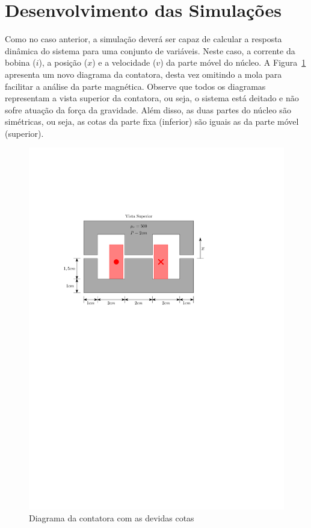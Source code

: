\documentclass[a4paper]{article}
\theoremstyle{definition}
\theoremstyle{plain}
\begin{document}
 


\section{Desenvolvimento das Simulações}


Como no caso anterior, a simulação deverá ser capaz de calcular a resposta dinâmica do sistema para uma conjunto de variáveis. Neste caso, a corrente da bobina ($i$), a posição ($x$) e a velocidade ($v$) da parte móvel do núcleo. A Figura~\ref{fig:cotas} apresenta um novo diagrama da contatora, desta vez omitindo a mola para facilitar a análise da parte magnética. Observe que todos os diagramas representam a vista superior da contatora, ou seja, o sistema está deitado e não sofre atuação da força da gravidade. Além disso, as duas partes do núcleo são simétricas, ou seja, as cotas da parte fixa (inferior) são iguais as da parte móvel (superior).



\begin{figure}[!htb]
\centering
\includegraphics[width=0.85\linewidth]{./figuras/contatora_cotas}
\caption{Diagrama da contatora com as devidas cotas}
\label{fig:cotas}
\end{figure}
\end{document}
